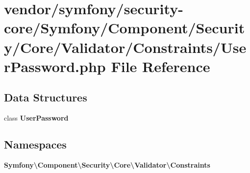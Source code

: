 \section{vendor/symfony/security-\/core/\+Symfony/\+Component/\+Security/\+Core/\+Validator/\+Constraints/\+User\+Password.php File Reference}
\label{_user_password_8php}
\subsection*{Data Structures}
\begin{DoxyCompactItemize}
\item 
class {\bf User\+Password}
\end{DoxyCompactItemize}
\subsection*{Namespaces}
\begin{DoxyCompactItemize}
\item 
 {\bf Symfony\textbackslash{}\+Component\textbackslash{}\+Security\textbackslash{}\+Core\textbackslash{}\+Validator\textbackslash{}\+Constraints}
\end{DoxyCompactItemize}
